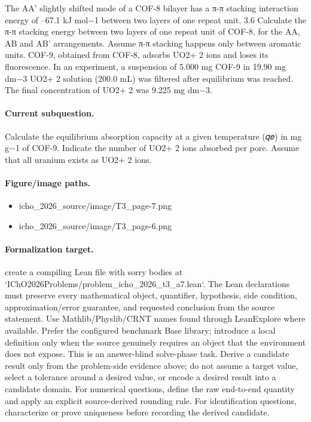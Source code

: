 The AA' slightly shifted mode of a COF-8 bilayer has a π-π stacking interaction energy of –67.1 kJ mol−1 between two layers of one repeat unit. 3.6 Calculate the π-π stacking energy between two layers of one repeat unit of COF-8, for the AA, AB and AB' arrangements. Assume π-π stacking happens only between aromatic units. COF-9, obtained from COF-8, adsorbs UO2+ 2 ions and loses its fluorescence. In an experiment, a suspension of 5.000 mg COF-9 in 19.90 mg dm−3 UO2+ 2 solution (200.0 mL) was filtered after equilibrium was reached. The final concentration of UO2+ 2 was 9.225 mg dm−3.

\paragraph{Current subquestion.}
Calculate the equilibrium absorption capacity at a given temperature (𝑞𝑒) in mg g−1 of COF-9. Indicate the number of UO2+ 2 ions absorbed per pore. Assume that all uranium exists as UO2+ 2 ions.

\paragraph{Figure/image paths.}
\begin{itemize}
\item icho\_2026\_source/image/T3\_page-7.png
\item icho\_2026\_source/image/T3\_page-6.png
\end{itemize}

\paragraph{Formalization target.}
create a compiling Lean file with sorry bodies at `IChO2026Problems/problem\_icho\_2026\_t3\_a7.lean`.
The Lean declarations must preserve every mathematical object, quantifier, hypothesis, side condition, approximation/error guarantee, and requested conclusion from the source statement.
Use Mathlib/Physlib/CRNT names found through LeanExplore where available. Prefer the configured benchmark Base library; introduce a local definition only when the source genuinely requires an object that the environment does not expose.
This is an answer-blind solve-phase task. Derive a candidate result only from the problem-side evidence above; do not assume a target value, select a tolerance around a desired value, or encode a desired result into a candidate domain.
For numerical questions, define the raw end-to-end quantity and apply an explicit source-derived rounding rule. For identification questions, characterize or prove uniqueness before recording the derived candidate.

